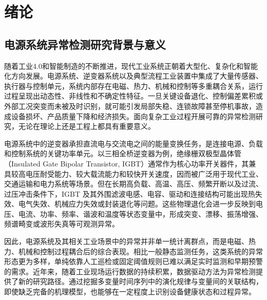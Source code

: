 \documentclass[bachelor, vlined]{DissertUESTC}
\begin{document}
	\tableofcontents  %




	\chapter{绪论}

	\section{电源系统异常检测研究背景与意义}

    随着工业4.0和智能制造的不断推进，现代工业系统正朝着大型化、复杂化和智能化方向发展。电源系统、逆变器系统以及典型流程工业装置中集成了大量传感器、执行器与控制单元，系统内部存在电磁、热力、机械和控制等多重耦合关系，运行过程呈现出动态性、非线性和不确定性特征。一旦关键设备退化、控制偏差累积或外部工况突变而未被及时识别，就可能引发局部失稳、连锁故障甚至停机事故，造成设备损坏、产品质量下降和经济损失。面向复杂工业过程开展可靠的异常检测研究，无论在理论上还是工程上都具有重要意义。

    电源系统中的逆变器承担直流电与交流电之间的能量变换任务，是连接电源、负载和控制系统的关键功率单元。以三相全桥逆变器为例，绝缘栅双极型晶体管（Insulated Gate Bipolar Transistor, IGBT）通常作为核心功率开关器件，其兼具较高电压耐受能力、较大载流能力和较快开关速度，因而被广泛用于现代工业、交通运输和电力系统等场景。但在长期高负载、高温、高压、频繁开断以及过流、过压冲击条件下，IGBT 及其外围滤波电感、电容、驱动和连接结构可能出现热失效、电气失效、机械应力失效或封装退化等问题。这些物理退化会进一步反映到电压、电流、功率、频率、谐波和温度等状态变量中，形成突变、漂移、振荡增强、频谱畸变或波形失真等可观测异常。

    因此，电源系统及其相关工业场景中的异常并非单一统计离群点，而是电磁、热力、机械和控制过程耦合后的综合表现。相比一般静态监测任务，这类系统的异常形态更为多样，单纯依靠人工巡检或固定阈值规则已难以满足实时监测和早期预警的需求。近年来，随着工业现场运行数据的持续积累，数据驱动方法为异常检测提供了新的研究路径。通过挖掘多变量时间序列中的演化规律与变量间的关联结构，即使缺乏完备的机理模型，也能够在一定程度上识别设备健康状态和过程异常。
\end{document}
